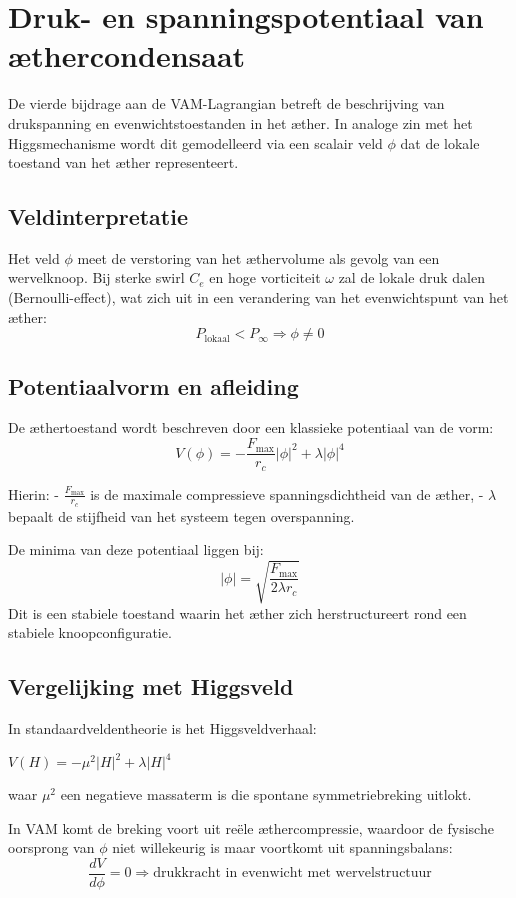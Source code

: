 \section{Druk- en spanningspotentiaal van æthercondensaat}

De vierde bijdrage aan de VAM-Lagrangian betreft de beschrijving van drukspanning en evenwichtstoestanden in het æther. In analoge zin met het Higgsmechanisme wordt dit gemodelleerd via een scalair veld $\phi$ dat de lokale toestand van het æther representeert.

\subsection*{Veldinterpretatie}
Het veld $\phi$ meet de verstoring van het æthervolume als gevolg van een wervelknoop. Bij sterke swirl $C_e$ en hoge vorticiteit $\omega$ zal de lokale druk dalen (Bernoulli-effect), wat zich uit in een verandering van het evenwichtspunt van het æther:
\[
    P_\text{lokaal} < P_\infty \Rightarrow \phi \neq 0
\]

\subsection*{Potentiaalvorm en afleiding}
De æthertoestand wordt beschreven door een klassieke potentiaal van de vorm:
\[
    V(\phi) = -\frac{F_\text{max}}{r_c} |\phi|^2 + \lambda |\phi|^4
\]

Hierin:
- $\frac{F_\text{max}}{r_c}$ is de maximale compressieve spanningsdichtheid van de æther,
- $\lambda$ bepaalt de stijfheid van het systeem tegen overspanning.

De minima van deze potentiaal liggen bij:
\[
    |\phi| = \sqrt{\frac{F_\text{max}}{2 \lambda r_c}}
\]
Dit is een stabiele toestand waarin het æther zich herstructureert rond een stabiele knoopconfiguratie.

\subsection*{Vergelijking met Higgsveld}
In standaardveldentheorie is het Higgsveldverhaal:\newline
\centerline{$V(H) = -\mu^2 |H|^2 + \lambda |H|^4$}
waar $\mu^2$ een negatieve massaterm is die spontane symmetriebreking uitlokt.

In VAM komt de breking voort uit reële æthercompressie, waardoor de fysische oorsprong van $\phi$ niet willekeurig is maar voortkomt uit spanningsbalans:
\[
    \frac{dV}{d\phi} = 0 \Rightarrow \text{drukkracht in evenwicht met wervelstructuur}
\]

